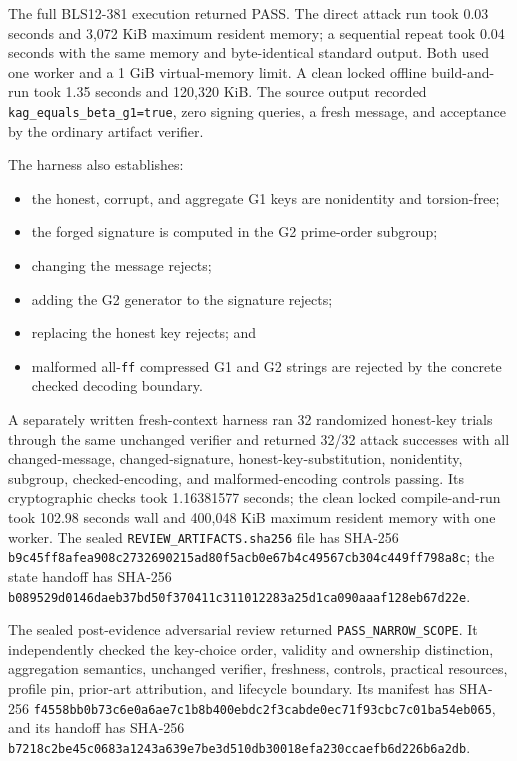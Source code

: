 \documentclass[10pt,a4paper]{article}
\begin{document}
The full BLS12-381 execution returned PASS. The direct attack run took 0.03
seconds and 3,072 KiB maximum resident memory; a sequential repeat took 0.04
seconds with the same memory and byte-identical standard output. Both used one
worker and a 1 GiB virtual-memory limit. A clean locked offline build-and-run
took 1.35 seconds and 120,320 KiB. The source output recorded
\texttt{kag\_equals\_beta\_g1=true}, zero signing queries, a fresh message,
and acceptance by the ordinary artifact verifier.

The harness also establishes:
\begin{itemize}
  \item the honest, corrupt, and aggregate G1 keys are nonidentity and
        torsion-free;
  \item the forged signature is computed in the G2 prime-order subgroup;
  \item changing the message rejects;
  \item adding the G2 generator to the signature rejects;
  \item replacing the honest key rejects; and
  \item malformed all-\texttt{ff} compressed G1 and G2 strings are rejected
        by the concrete checked decoding boundary.
\end{itemize}

A separately written fresh-context harness ran 32 randomized honest-key
trials through the same unchanged verifier and returned 32/32 attack
successes with all changed-message, changed-signature, honest-key-substitution,
nonidentity, subgroup, checked-encoding, and malformed-encoding controls
passing. Its cryptographic checks took 1.16381577 seconds; the clean locked
compile-and-run took 102.98 seconds wall and 400,048 KiB maximum resident
memory with one worker. The sealed \texttt{REVIEW\_ARTIFACTS.sha256} file has
SHA-256
\texttt{b9c45ff8afea908c2732690215ad80f5acb0e67b4c49567cb304c449ff798a8c};
the state handoff has SHA-256
\texttt{b089529d0146daeb37bd50f370411c311012283a25d1ca090aaaf128eb67d22e}.

The sealed post-evidence adversarial review returned
\texttt{PASS\_NARROW\_SCOPE}. It independently checked the key-choice order,
validity and ownership distinction, aggregation semantics, unchanged verifier,
freshness, controls, practical resources, profile pin, prior-art attribution,
and lifecycle boundary. Its manifest has SHA-256
\texttt{f4558bb0b73c6e0a6ae7c1b8b400ebdc2f3cabde0ec71f93cbc7c01ba54eb065},
and its handoff has SHA-256
\texttt{b7218c2be45c0683a1243a639e7be3d510db30018efa230ccaefb6d226b6a2db}.
\end{document}
